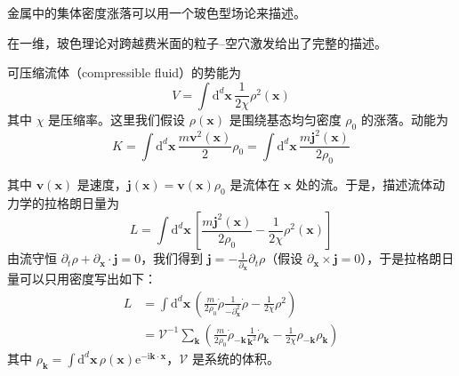 \begin{keypoints}
\item 金属中的集体密度涨落可以用一个玻色型场论来描述。
\item 在一维，玻色理论对跨越费米面的粒子--空穴激发给出了完整的描述。
\end{keypoints}

可压缩流体（compressible fluid）的势能为
\begin{equation*}
V=\int\mathrm{d}^d\pmb{x}\,\frac{1}{2\chi}\rho^2(\pmb{x})
\end{equation*}
其中 $\chi$ 是压缩率。这里我们假设 $\rho(\pmb{x})$ 是围绕基态均匀密度 $\rho_0$ 的涨落。动能为
\begin{equation*}
K=\int\mathrm{d}^d\pmb{x}\,\frac{m\pmb{v}^2(\pmb{x})}{2}\rho_0=\int\mathrm{d}^d\pmb{x}\,\frac{m\pmb{j}^2(\pmb{x})}{2\rho_0}
\end{equation*}


其中 $\pmb{v}(\pmb{x})$ 是速度，$\pmb{j}(\pmb{x})=\pmb{v}(\pmb{x})\rho_0$ 是流体在 $\pmb{x}$ 处的流。于是，描述流体动力学的拉格朗日量为
\begin{equation*}
L=\int\mathrm{d}^d\pmb{x}\,\left[\frac{m\pmb{j}^2(\pmb{x})}{2\rho_0}-\frac{1}{2\chi}\rho^2(\pmb{x})\right]\tag{5.1.2}
\end{equation*}
由流守恒 $\partial_t\rho+\partial_{\pmb{x}}\cdot\pmb{j}=0$，我们得到 $\pmb{j}=-\frac{1}{\partial_{\pmb{x}}}\partial_t\rho$（假设 $\partial_{\pmb{x}}\times\pmb{j}=0$），于是拉格朗日量可以只用密度写出如下：
\begin{align*}
L &= \int\mathrm{d}^d\pmb{x}\,\left(\frac{m}{2\rho_0}\dot{\rho}\frac{1}{-\partial_{\pmb{x}}^2}\dot{\rho}-\frac{1}{2\chi}\rho^2\right)\tag{5.1.3}\\
&= \mathcal{V}^{-1}\sum_{\pmb{k}}\left(\frac{m}{2\rho_0}\dot{\rho}_{-\pmb{k}}\frac{1}{\pmb{k}^2}\dot{\rho}_{\pmb{k}}-\frac{1}{2\chi}\rho_{-\pmb{k}}\rho_{\pmb{k}}\right)\tag{5.1.4}
\end{align*}
其中 $\rho_{\pmb{k}}=\int\mathrm{d}^d\pmb{x}\,\rho(\pmb{x})\mathrm{e}^{-\mathrm{i}\pmb{k}\cdot\pmb{x}}$，$\mathcal{V}$ 是系统的体积。

